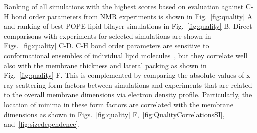 \documentclass[fleqn,10pt]{wlscirep}
\begin{document}
Ranking of all simulations with the highest scores based on evaluation against C-H bond order parameters from NMR experiments is shown in Fig.~\ref{fig:quality} A and ranking of best POPE lipid bilayer simulations in Fig.~\ref{fig:quality} B. Direct comparisons with experiments for selected simulations are shown in Figs.~\ref{fig:quality} C-D. C-H bond order parameters are sensitive to conformational ensembles of individual lipid molecules~\cite{ollila16}, but they correlate well also with the membrane thickness and lateral packing as shown in Fig.~\ref{fig:quality} F. This is complemented by comparing the absolute values of x-ray scattering form factors between simulations and experiments that are related to the overall membrane dimensions via electron density profile. Particularly, the location of minima in these form factors are correlated with the membrane dimensions as shown in Figs.~\ref{fig:quality} F,~\ref{fig:QualityCorrelationsSI}, and~\ref{fig:sizedependence}.




\end{document}
